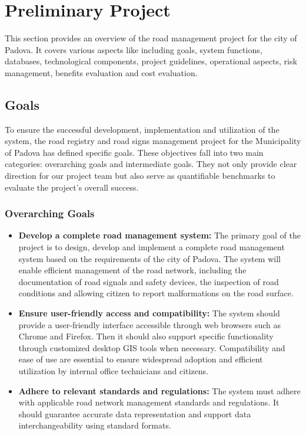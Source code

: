 \section{Preliminary Project}
This section provides an overview of the road management project for the city of Padova. It covers various aspects like including goals, system functions, databases, technological components, project guidelines, operational aspects, risk management, benefits evaluation and cost evaluation. 

\subsection{Goals}
To ensure the successful development, implementation and utilization of the system, the road registry and road signs management project for the Municipality of Padova has defined specific goals. These objectives fall into two main categories: overarching goals and intermediate goals. They not only provide clear direction for our project team but also serve as quantifiable benchmarks to evaluate the project's overall success.

\subsubsection{Overarching Goals}
\begin{itemize}
    \item\textbf {Develop a complete road management system:}
    The primary goal of the project is to design, develop and implement a complete road management system based on the requirements of the city of Padova. The system will enable efficient management of the road network, including the documentation of road signals and safety devices, the inspection of road conditions and allowing citizen to report malformations on the road surface.
    \item\textbf {Ensure user-friendly access and compatibility:}
    The system should provide a user-friendly interface accessible through web browsers such as Chrome and Firefox. Then it should also support specific functionality through customized desktop GIS tools when necessary. Compatibility and ease of use are essential to ensure widespread adoption and efficient utilization by  internal office technicians and citizens.
    \item\textbf {Adhere to relevant standards and regulations:}
    The system must adhere with applicable road network management standards and regulations. It should guarantee accurate data representation and support data interchangeability using standard formats.
\end{itemize}

